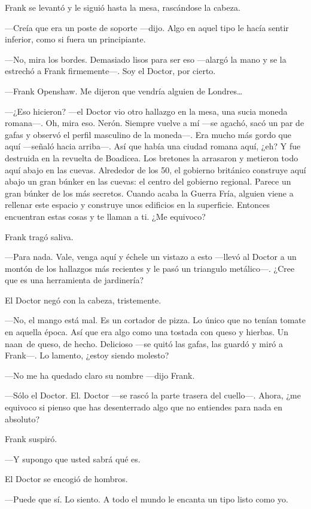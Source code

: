 Frank se levantó y le siguió hasta la mesa, rascándose la cabeza.

---Creía que era un poste de soporte ---dijo. Algo en aquel tipo le hacía
sentir inferior, como si fuera un principiante.

---No, mira los bordes. Demasiado lisos para ser eso ---alargó la mano y
se la estrechó a Frank firmemente---. Soy el Doctor, por cierto.

---Frank Openshaw. Me dijeron que vendría alguien de Londres\ldots{}

---¿Eso hicieron? ---el Doctor vio otro hallazgo en la mesa, una sucia
moneda romana---. Oh, mira eso. Nerón. Siempre vuelve a mí ---se agachó,
sacó un par de gafas y observó el perfil masculino de la moneda---. Era
mucho más gordo que aquí ---señaló hacia arriba---. Así que había una
ciudad romana aquí, ¿eh? Y fue destruida en la revuelta de Boadicea.
Los bretones la arrasaron y metieron todo aquí abajo en las cuevas.
Alrededor de los 50, el gobierno británico construye aquí abajo un gran
búnker en las cuevas: el centro del gobierno regional. Parece un gran
búnker de los más secretos. Cuando acaba la Guerra Fría, alguien viene a
rellenar este espacio y construye unos edificios en la superficie.
Entonces encuentran estas cosas y te llaman a ti. ¿Me equivoco?

Frank tragó saliva.

---Para nada. Vale, venga aquí y échele un vistazo a esto ---llevó al
Doctor a un montón de los hallazgos más recientes y le pasó un triangulo
metálico---. ¿Cree que es una herramienta de jardinería?

El Doctor negó con la cabeza, tristemente.

---No, el mango está mal. Es un cortador de pizza. Lo único que no tenían
tomate en aquella época. Así que era algo como una tostada con queso y
hierbas. Un naan~de queso, de hecho. Delicioso ---se quitó las gafas, las
guardó y miró a Frank---. Lo lamento, ¿estoy siendo molesto?

---No me ha quedado claro su nombre ---dijo Frank.

---Sólo el Doctor. El. Doctor ---se rascó la parte trasera del cuello---.
Ahora, ¿me equivoco si pienso que has desenterrado algo que no entiendes
para nada en absoluto?

Frank suspiró.

---Y supongo que usted sabrá qué es.

El Doctor se encogió de hombros.

---Puede que sí. Lo siento. A todo el mundo le encanta un tipo listo como
yo.

